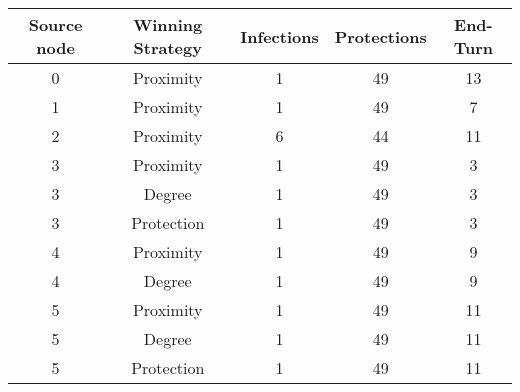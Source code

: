 \documentclass[results.tex]{subfiles}
\begin{document}
    \begin{center}
        \begin{tabular}{| c || c | c | c | c |}
            \hline
            {\bfseries Source node} & {\bfseries Winning Strategy} & {\bfseries Infections} & {\bfseries Protections}
            & {\bfseries End-Turn}
            \\  %
            \hline\hline
            0                       & Proximity                    & 1                      & 49                      & 13                   \\
            \hline
            1                       & Proximity                    & 1                      & 49                      & 7                    \\
            \hline
            2                       & Proximity                    & 6                      & 44                      & 11                   \\
            \hline
            3                       & Proximity                    & 1                      & 49                      & 3                    \\
            \hline
            3                       & Degree                       & 1                      & 49                      & 3                    \\
            \hline
            3                       & Protection                   & 1                      & 49                      & 3                    \\
            \hline
            4                       & Proximity                    & 1                      & 49                      & 9                    \\
            \hline
            4                       & Degree                       & 1                      & 49                      & 9                    \\
            \hline
            5                       & Proximity                    & 1                      & 49                      & 11                   \\
            \hline
            5                       & Degree                       & 1                      & 49                      & 11                   \\
            \hline
            5                       & Protection                   & 1                      & 49                      & 11                   \\

\end{tabular}
\end{center}
\end{document}
